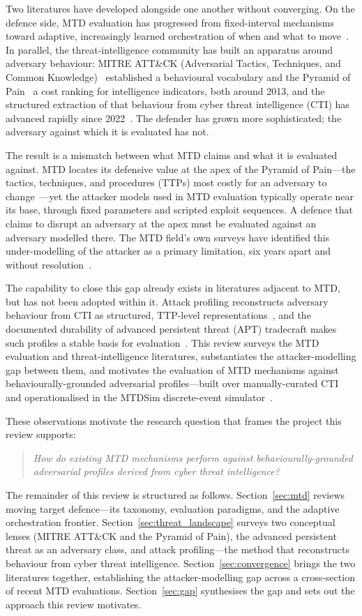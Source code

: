 Two literatures have developed alongside one another without converging. On the
defence side, MTD evaluation has progressed from fixed-interval mechanisms
toward adaptive, increasingly learned orchestration of when and what to
move~\cite{cho2020}. In parallel, the threat-intelligence community has built an
apparatus around adversary behaviour: MITRE ATT\&CK (Adversarial Tactics, Techniques, and Common Knowledge)~\cite{alsada2024}
established a behavioural vocabulary and the Pyramid of Pain~\cite{bianco2013} a
cost ranking for intelligence indicators, both around 2013, and the structured
extraction of that behaviour from cyber threat
intelligence (CTI) has advanced rapidly since 2022~\cite{ctid2025attackflow}.
The defender has grown more sophisticated; the adversary against which it is
evaluated has not.

The result is a mismatch between what MTD claims and what it is evaluated
against. MTD locates its defensive value at the apex of the Pyramid of
Pain---the tactics, techniques, and procedures (TTPs) most costly for an adversary to
change~\cite{bianco2013}---yet the attacker models used in MTD evaluation
typically operate near its base, through fixed parameters and scripted exploit
sequences. A defence that claims to disrupt an adversary at the apex must be
evaluated against an adversary modelled there. The MTD field's own surveys have
identified this under-modelling of the attacker as a primary limitation, six
years apart and without resolution~\cite{cho2020, jalowski2026}.

The capability to close this gap already exists in literatures adjacent to MTD,
but has not been adopted within it. Attack profiling reconstructs adversary
behaviour from CTI as structured, TTP-level representations~\cite{rodriguez2024},
and the documented durability of advanced persistent threat (APT) tradecraft
makes such profiles a stable basis for evaluation~\cite{alshamrani2019}. This
review surveys the MTD evaluation and threat-intelligence literatures,
substantiates the attacker-modelling gap between them, and motivates the
evaluation of MTD mechanisms against behaviourally-grounded adversarial
profiles---built over manually-curated CTI and operationalised in the MTDSim
discrete-event simulator~\cite{brown2023}.

These observations motivate the research question that frames the project this
review supports:
\begin{quote}
\textit{How do existing MTD mechanisms perform against behaviourally-grounded
adversarial profiles derived from cyber threat intelligence?}
\end{quote}
The remainder of this review is structured as follows.
Section~\ref{sec:mtd} reviews moving target defence---its taxonomy, evaluation
paradigms, and the adaptive orchestration frontier.
Section~\ref{sec:threat_landscape} surveys two conceptual lenses (MITRE
ATT\&CK and the Pyramid of Pain), the advanced persistent threat as an
adversary class, and attack profiling---the method that reconstructs behaviour
from cyber threat intelligence. Section~\ref{sec:convergence} brings
the two literatures together, establishing the attacker-modelling gap across a
cross-section of recent MTD evaluations. Section~\ref{sec:gap} synthesises the
gap and sets out the approach this review motivates.